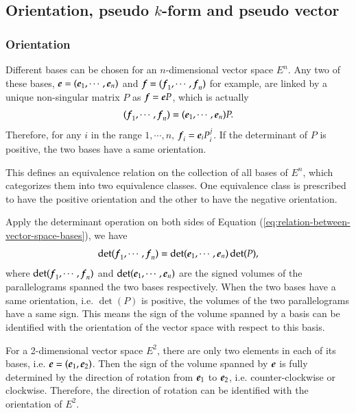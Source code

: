 \documentclass[11pt, a4paper]{book}
\begin{document}
\subsection{Orientation, pseudo $k$-form and pseudo vector}

\subsubsection{Orientation}

\begin{Definition}
  \label{def:vector-space-orientation}
  Different bases can be chosen for an $n$-dimensional vector space $E^n$. Any two of
  these bases, $\boldsymbol{e} = (\boldsymbol{e}_1,\cdots,\boldsymbol{e}_n)$ and
  $\boldsymbol{f} = (\boldsymbol{f}_1,\cdots,\boldsymbol{f}_n)$ for example, are linked by a unique
  non-singular matrix $P$ as $\boldsymbol{f} = \boldsymbol{e} P$, which is actually
  \begin{equation}
    \label{eq:relation-between-vector-space-bases}
    (\boldsymbol{f}_1,\cdots,\boldsymbol{f}_n) = (\boldsymbol{e}_1,\cdots,\boldsymbol{e}_n) P.
  \end{equation}
  Therefore, for any $i$ in the range $1,\cdots,n$, $\boldsymbol{f}_i = \boldsymbol{e}_i P^j_i$. If
  the determinant of $P$ is positive, the two bases have a same orientation.

  This defines an equivalence relation on the collection of all bases of $E^n$, which
  categorizes them into two equivalence classes. One equivalence class is prescribed to
  have the positive orientation and the other to have the negative orientation.
\end{Definition}

Apply the determinant operation on both sides of Equation
(\ref{eq:relation-between-vector-space-bases}), we have
\begin{equation*}
  \det(\boldsymbol{f}_1,\cdots,\boldsymbol{f}_n) = \det(\boldsymbol{e}_1,\cdots,\boldsymbol{e}_n) \det(P),
\end{equation*}
where $\det(\boldsymbol{f}_1,\cdots,\boldsymbol{f}_n)$ and $\det(\boldsymbol{e}_1,\cdots,\boldsymbol{e}_n)$ are
the signed volumes of the parallelograms spanned the two bases respectively. When the two
bases have a same orientation, i.e. $\det(P)$ is positive, the volumes of the two
parallelograms have a same sign. This means the sign of the volume spanned by a basis can
be identified with the orientation of the vector space with respect to this basis.

\begin{Example}
  For a 2-dimensional vector space $E^2$, there are only two elements in each of its
  bases, i.e. $\boldsymbol{e} =(\boldsymbol{e}_1,\boldsymbol{e}_2)$. Then the sign of the volume spanned by
  $\boldsymbol{e}$ is fully determined by the direction of rotation from $\boldsymbol{e}_1$ to
  $\boldsymbol{e}_2$, i.e. counter-clockwise or clockwise. Therefore, the direction of rotation
  can be identified with the orientation of $E^2$.
\end{Example}
\end{document}
